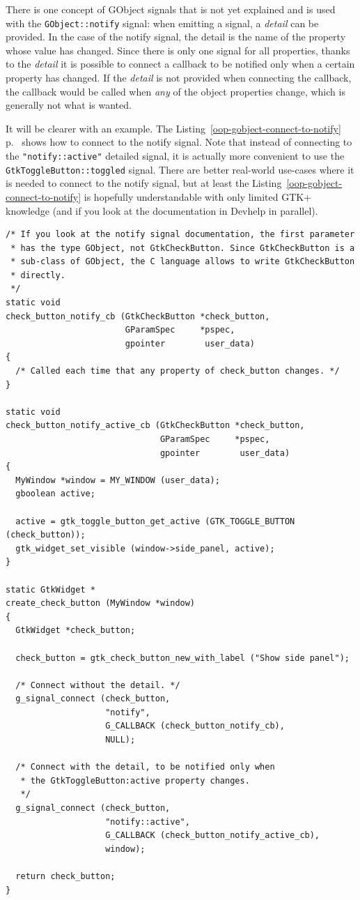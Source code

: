 There is one concept of GObject signals that is not yet explained and is used with the \lstinline{GObject::notify} signal: when emitting a signal, a \emph{detail} can be provided. In the case of the notify signal, the detail is the name of the property whose value has changed. Since there is only one signal for all properties, thanks to the \emph{detail} it is possible to connect a callback to be notified only when a certain property has changed. If the \emph{detail} is not provided when connecting the callback, the callback would be called when \emph{any} of the object properties change, which is generally not what is wanted.

It will be clearer with an example. The Listing~\ref{oop-gobject-connect-to-notify} p.~\pageref{oop-gobject-connect-to-notify} shows how to connect to the notify signal. Note that instead of connecting to the \lstinline{"notify::active"} detailed signal, it is actually more convenient to use the \lstinline{GtkToggleButton::toggled} signal. There are better real-world use-cases where it is needed to connect to the notify signal, but at least the Listing~\ref{oop-gobject-connect-to-notify} is hopefully understandable with only limited GTK+ knowledge (and if you look at the documentation in Devhelp in parallel).

\begin{lstlisting}[float, caption={Connecting to the notify signal to listen to property changes.}, label=oop-gobject-connect-to-notify]
/* If you look at the notify signal documentation, the first parameter
 * has the type GObject, not GtkCheckButton. Since GtkCheckButton is a
 * sub-class of GObject, the C language allows to write GtkCheckButton
 * directly.
 */
static void
check_button_notify_cb (GtkCheckButton *check_button,
                        GParamSpec     *pspec,
                        gpointer        user_data)
{
  /* Called each time that any property of check_button changes. */
}

static void
check_button_notify_active_cb (GtkCheckButton *check_button,
                               GParamSpec     *pspec,
                               gpointer        user_data)
{
  MyWindow *window = MY_WINDOW (user_data);
  gboolean active;

  active = gtk_toggle_button_get_active (GTK_TOGGLE_BUTTON (check_button));
  gtk_widget_set_visible (window->side_panel, active);
}

static GtkWidget *
create_check_button (MyWindow *window)
{
  GtkWidget *check_button;

  check_button = gtk_check_button_new_with_label ("Show side panel");

  /* Connect without the detail. */
  g_signal_connect (check_button,
                    "notify",
                    G_CALLBACK (check_button_notify_cb),
                    NULL);

  /* Connect with the detail, to be notified only when
   * the GtkToggleButton:active property changes.
   */
  g_signal_connect (check_button,
                    "notify::active",
                    G_CALLBACK (check_button_notify_active_cb),
                    window);

  return check_button;
}
\end{lstlisting}

